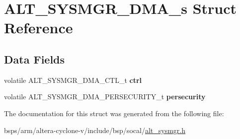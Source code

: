 \hypertarget{structALT__SYSMGR__DMA__s}{}\section{A\+L\+T\+\_\+\+S\+Y\+S\+M\+G\+R\+\_\+\+D\+M\+A\+\_\+s Struct Reference}
\label{structALT__SYSMGR__DMA__s}
\subsection*{Data Fields}
\begin{DoxyCompactItemize}
\item 
\mbox{\label{structALT__SYSMGR__DMA__s_a1fd8cf7b37931e1d11cb95b0d89c16b2}} 
volatile A\+L\+T\+\_\+\+S\+Y\+S\+M\+G\+R\+\_\+\+D\+M\+A\+\_\+\+C\+T\+L\+\_\+t {\bfseries ctrl}
\item 
\mbox{\label{structALT__SYSMGR__DMA__s_a39fe21bfed9edde06c72bb1b23e46f57}} 
volatile A\+L\+T\+\_\+\+S\+Y\+S\+M\+G\+R\+\_\+\+D\+M\+A\+\_\+\+P\+E\+R\+S\+E\+C\+U\+R\+I\+T\+Y\+\_\+t {\bfseries persecurity}
\end{DoxyCompactItemize}


The documentation for this struct was generated from the following file\+:\begin{DoxyCompactItemize}
\item 
bsps/arm/altera-\/cyclone-\/v/include/bsp/socal/\mbox{\hyperlink{alt__sysmgr_8h}{alt\+\_\+sysmgr.\+h}}\end{DoxyCompactItemize}
